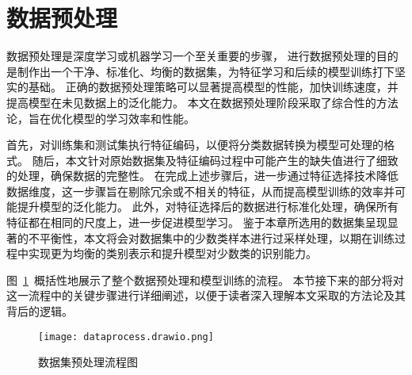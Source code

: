 \section{数据预处理}
数据预处理是深度学习或机器学习一个至关重要的步骤，
进行数据预处理的目的是制作出一个干净、标准化、均衡的数据集，为特征学习和后续的模型训练打下坚实的基础。
正确的数据预处理策略可以显著提高模型的性能，加快训练速度，并提高模型在未见数据上的泛化能力。
本文在数据预处理阶段采取了综合性的方法论，旨在优化模型的学习效率和性能。\par

首先，对训练集和测试集执行特征编码，以便将分类数据转换为模型可处理的格式。
随后，本文针对原始数据集及特征编码过程中可能产生的缺失值进行了细致的处理，确保数据的完整性。
在完成上述步骤后，进一步通过特征选择技术降低数据维度，这一步骤旨在剔除冗余或不相关的特征，从而提高模型训练的效率并可能提升模型的泛化能力。
此外，对特征选择后的数据进行标准化处理，确保所有特征都在相同的尺度上，进一步促进模型学习。
鉴于本章所选用的数据集呈现显著的不平衡性，本文将会对数据集中的少数类样本进行过采样处理，以期在训练过程中实现更为均衡的类别表示和提升模型对少数类的识别能力。\par

图~\ref{fig:dataprocess}~概括性地展示了整个数据预处理和模型训练的流程。
本节接下来的部分将对这一流程中的关键步骤进行详细阐述，以便于读者深入理解本文采取的方法论及其背后的逻辑。
\begin{figure}[htbp]
  \centering
  \texttt{[image: dataprocess.drawio.png]}
  \caption{数据集预处理流程图}
  \label{fig:dataprocess}
\end{figure}

